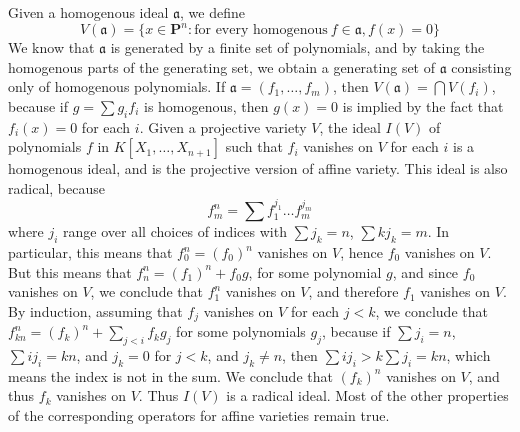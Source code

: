 Given a homogenous ideal $\mathfrak{a}$, we define
%
\[ V(\mathfrak{a}) = \{ x \in \mathbf{P}^n: \text{for every homogenous}\ f \in \mathfrak{a}, f(x) = 0 \} \]
%
We know that $\mathfrak{a}$ is generated by a finite set of polynomials, and by taking the homogenous parts of the generating set, we obtain a generating set of $\mathfrak{a}$ consisting only of homogenous polynomials. If $\mathfrak{a} = (f_1, \dots, f_m)$, then $V(\mathfrak{a}) = \bigcap V(f_i)$, because if $g = \sum g_i f_i$ is homogenous, then $g(x) = 0$ is implied by the fact that $f_i(x) = 0$ for each $i$. Given a projective variety $V$, the ideal $I(V)$ of polynomials $f$ in $K[X_1, \dots, X_{n+1}]$ such that $f_i$ vanishes on $V$ for each $i$ is a homogenous ideal, and is the projective version of affine variety. This ideal is also radical, because
%
\[ f^n_m = \sum f_1^{j_1} \dots f_m^{j_m} \]
%
where $j_i$ range over all choices of indices with $\sum j_k = n$, $\sum kj_k = m$. In particular, this means that $f^n_0 = (f_0)^n$ vanishes on $V$, hence $f_0$ vanishes on $V$. But this means that $f^n_n = (f_1)^n + f_0g$, for some polynomial $g$, and since $f_0$ vanishes on $V$, we conclude that $f_1^n$ vanishes on $V$, and therefore $f_1$ vanishes on $V$. By induction, assuming that $f_j$ vanishes on $V$ for each $j < k$, we conclude that $f^n_{kn} = (f_k)^n + \sum_{j < i} f_kg_j$ for some polynomials $g_j$, because if $\sum j_i = n$, $\sum ij_i = kn$, and $j_k = 0$ for $j < k$, and $j_k \neq n$, then $\sum ij_i > k\sum j_i = kn$, which means the index is not in the sum. We conclude that $(f_k)^n$ vanishes on $V$, and thus $f_k$ vanishes on $V$. Thus $I(V)$ is a radical ideal. Most of the other properties of the corresponding operators for affine varieties remain true.
%
